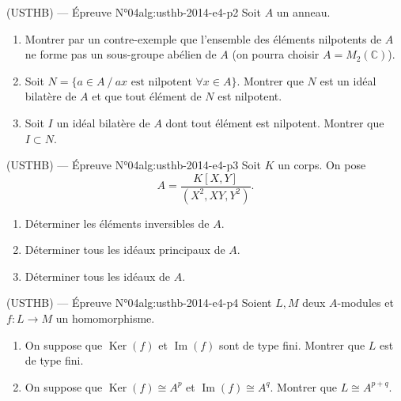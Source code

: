 \newpage

\begin{problem}{(USTHB) — Épreuve N°04}{alg:usthb-2014-e4-p2}
Soit $A$ un anneau.
\begin{enumerate}
\item Montrer par un contre-exemple que l'ensemble des éléments nilpotents de $A$
      ne forme pas un sous-groupe abélien de $A$ (on pourra choisir
      $A=M_2(\mathbb{C})$).
\item Soit $N=\{a\in A \ / \ ax \text{ est nilpotent } \forall x\in A\}$. Montrer que
      $N$ est un idéal bilatère de $A$ et que tout élément de $N$ est nilpotent.
\item Soit $I$ un idéal bilatère de $A$ dont tout élément est nilpotent. Montrer que
      $I\subset N$.
\end{enumerate}

\end{problem}

\newpage

\begin{problem}{(USTHB) — Épreuve N°04}{alg:usthb-2014-e4-p3}
Soit $K$ un corps. On pose
$$
A=\frac{K[X,Y]}{(X^2,XY,Y^2)}.
$$
\begin{enumerate}
\item Déterminer les éléments inversibles de $A$.
\item Déterminer tous les idéaux principaux de $A$.
\item Déterminer tous les idéaux de $A$.
\end{enumerate}

\end{problem}

\newpage

\begin{problem}{(USTHB) — Épreuve N°04}{alg:usthb-2014-e4-p4}
Soient $L,M$ deux $A$-modules et $f:L\to M$ un homomorphisme.
\begin{enumerate}
\item On suppose que $\operatorname{Ker}(f)$ et $\operatorname{Im}(f)$ sont de type
      fini. Montrer que $L$ est de type fini.
\item On suppose que $\operatorname{Ker}(f)\cong A^p$ et
      $\operatorname{Im}(f)\cong A^q$. Montrer que $L\cong A^{p+q}$.
\end{enumerate}

\end{problem}

